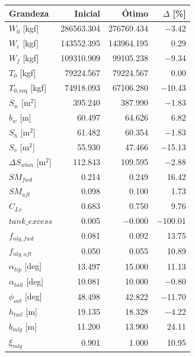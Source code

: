 \begin{tabular}{lrrr}
\toprule
Grandeza & Inicial & Ótimo & $\Delta$ [\%] \\
\midrule
$W_0$ [kgf] & 286563.304 & 276769.434 & $-$3.42 \\
$W_e$ [kgf] & 143552.395 & 143964.195 & 0.29 \\
$W_f$ [kgf] & 109310.909 & 99105.238 & $-$9.34 \\
$T_0$ [kgf] & 79224.567 & 79224.567 & 0.00 \\
$T_{0,\mathrm{req}}$ [kgf] & 74918.093 & 67106.280 & $-$10.43 \\
$S_w$ [m$^2$] & 395.240 & 387.990 & $-$1.83 \\
$b_w$ [m] & 60.497 & 64.626 & 6.82 \\
$S_h$ [m$^2$] & 61.482 & 60.354 & $-$1.83 \\
$S_v$ [m$^2$] & 55.930 & 47.466 & $-$15.13 \\
$\Delta S_{wlan}$ [m$^2$] & 112.843 & 109.595 & $-$2.88 \\
$SM_{fwd}$ & 0.214 & 0.249 & 16.42 \\
$SM_{aft}$ & 0.098 & 0.100 & 1.73 \\
$C_{Lv}$ & 0.683 & 0.750 & 9.76 \\
$tank\_excess$ & 0.005 & $-$0.000 & $-$100.01 \\
$f_{nlg,fwd}$ & 0.081 & 0.092 & 13.75 \\
$f_{nlg,aft}$ & 0.050 & 0.055 & 10.89 \\
$\alpha_{tip}$ [deg] & 13.497 & 15.000 & 11.13 \\
$\alpha_{tail}$ [deg] & 10.081 & 10.000 & $-$0.80 \\
$\phi_{ovt}$ [deg] & 48.498 & 42.822 & $-$11.70 \\
$h_{tail}$ [m] & 19.135 & 18.328 & $-$4.22 \\
$b_{mlg}$ [m] & 11.200 & 13.900 & 24.11 \\
$\xi_{mlg}$ & 0.901 & 1.000 & 10.95 \\
\bottomrule
\end{tabular}